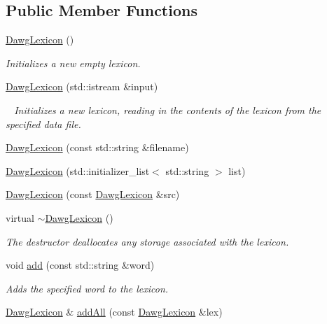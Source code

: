 \subsection*{Public Member Functions}
\begin{DoxyCompactItemize}
\item 
\mbox{\hyperlink{classDawgLexicon_ad974b1304fbda26ca2e7b0775640e826}{Dawg\+Lexicon}} ()
\begin{DoxyCompactList}\small\item\em Initializes a new empty lexicon. \end{DoxyCompactList}\item 
\mbox{\hyperlink{classDawgLexicon_ad85bfb9847f7e7e33b68287b6ec800fd}{Dawg\+Lexicon}} (std\+::istream \&input)
\begin{DoxyCompactList}\small\item\em ~\newline
 Initializes a new lexicon, reading in the contents of the lexicon from the specified data file. \end{DoxyCompactList}\item 
\mbox{\hyperlink{classDawgLexicon_a2514881fb902166faf4b4a2c58128b7f}{Dawg\+Lexicon}} (const std\+::string \&filename)
\item 
\mbox{\hyperlink{classDawgLexicon_ab482763811fb89cbf52d64bd789ffff1}{Dawg\+Lexicon}} (std\+::initializer\+\_\+list$<$ std\+::string $>$ list)
\item 
\mbox{\hyperlink{classDawgLexicon_a74910e5f5679d365aad6a6c47f00c655}{Dawg\+Lexicon}} (const \mbox{\hyperlink{classDawgLexicon}{Dawg\+Lexicon}} \&src)
\item 
virtual \mbox{\hyperlink{classDawgLexicon_ad36da24eead1f7989047bf2d45b1a082}{$\sim$\+Dawg\+Lexicon}} ()
\begin{DoxyCompactList}\small\item\em The destructor deallocates any storage associated with the lexicon. \end{DoxyCompactList}\item 
void \mbox{\hyperlink{classDawgLexicon_a8713d0dbe1a2aa37acf4a75ea3c5bf40}{add}} (const std\+::string \&word)
\begin{DoxyCompactList}\small\item\em Adds the specified word to the lexicon. \end{DoxyCompactList}\item 
\mbox{\hyperlink{classDawgLexicon}{Dawg\+Lexicon}} \& \mbox{\hyperlink{classDawgLexicon_abcb16967ab02dd1106a92f2a93d8a13c}{add\+All}} (const \mbox{\hyperlink{classDawgLexicon}{Dawg\+Lexicon}} \&lex)

\end{DoxyCompactItemize}
